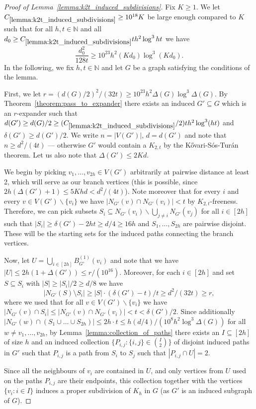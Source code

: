 \documentclass[10pt, a4paper]{article}
\numberwithin{theorem}{section} %
\theoremstyle{remark}
\theoremstyle{definition}
\begin{document}
\begin{proof}[Proof of Lemma~\ref{lemma:k2t_induced_subdivisions}]
    Fix $K \geq 1$.
    We let $C_{\ref{lemma:k2t_induced_subdivisions}} \geq 10^{18}K$ be large enough compared to $K$ such that for all $h, t \in \mathbb{N}$ and all $d_0 \geq C_{\ref{lemma:k2t_induced_subdivisions}} th^2\log^3ht$ we have
    \[
        \frac{d_0^2}{128t} \geq 10^{23}h^2(Kd_0)\log^3(Kd_0).
    \]
    In the following, we fix $h, t \in \mathbb{N}$ and let $G$ be a graph satisfying the conditions of the lemma.

    First, we let $r = (d(G)/2)^2/(32t) \geq 10^{23}h^2\Delta(G)\log^3\Delta(G)$.
    By Theorem~\ref{theorem:pass_to_expander} there exists an induced $G' \subseteq G$ which is an $r$-expander such that $d(G') \geq d(G)/2 \geq (C_{\ref{lemma:k2t_induced_subdivisions}}/2)th^2\log^3(ht)$ and $\delta(G') \geq d(G')/2$.
    We write $n = |V(G')|$, $d = d(G')$ and note that $n \geq d^2/(4t)$ --- otherwise $G'$ would contain a $K_{2, t}$ by the K\H{o}vari-S\'os-Tur\'an theorem. Let us also note that $\Delta(G')\le 2Kd$. 

    We begin by picking $v_1, \dots, v_{2h} \in V(G')$ arbitrarily at pairwise distance at least 2, which will serve as our branch vertices (this is possible, since $2h(\Delta(G')+1) \leq 5Khd < d^2/(4t)$).
    Note moreover that for every $i$ and every $v \in V(G')\backslash \{v_i\}$ we have $|N_{G'}(v) \cap N_{G'}(v_i)| <t$ by $K_{2, t}$-freeness.
    Therefore, we can pick subsets $S_i \subseteq N_{G'}(v_i)\backslash \bigcup_{j\neq i}N_{G'}(v_j)$ for all $i \in [2h]$ such that $|S_i| \geq \delta(G') - 2ht \geq d/4 \geq 16h$ and $S_1, \dots, S_{2h}$ are pairwise disjoint.
    These will be the starting sets for the induced paths connecting the branch vertices.

    Now, let $U = \bigcup_{i \in [2h]}B^{(1)}_{G'}(v_i)$ and note that we have $|U| \leq 2h(1 +\Delta(G')) \leq r/(10^{16})$.
    Moreover, for each $i \in [2h]$ and set $S \subseteq S_i$ with $|S| \geq |S_i|/2 \geq d/8$ we have
    \[
        |N_{G'}(S) \setminus S_i| \geq |S|\cdot (\delta(G') - t)/t \geq d^2/(32t) \geq r,
    \]
    where we used that for all $v \in V(G')\backslash \{v_i\} $ we have $|N_{G'}(v) \cap S_i|\le |N_{G'}(v)\cap N_{G'}(v_i)| <t<\delta(G')/2$.
    Since additionally $|N_{G'}(w) \cap (S_1 \cup \dots \cup S_{2h})| \leq 2h \cdot t \leq h(d/4)/(10^8h^2\log^3\Delta(G))$ for all $w \neq v_1, \dots, v_{2h}$, by Lemma~\ref{lemma:collection_of_paths} there exists an $I \subseteq [2h]$ of size $h$ and an induced collection $\{P_{i, j} : \{i, j\} \in \binom{I}{2}\}$ of disjoint induced paths in $G'$ such that $P_{i, j}$ is a path from $S_i$ to $S_j$ such that $|P_{i, j} \cap U| = 2$.
    
    Since all the neighbours of $v_i$ are contained in $U$, and only vertices from $U$ used on the paths $P_{i, j}$ are their endpoints, this collection together with the vertices $\{v_i : i \in I\}$ induces a proper subdivision of $K_h$ in $G$ (as $G'$ is an induced subgraph of $G$). 
\end{proof}
\end{document}
